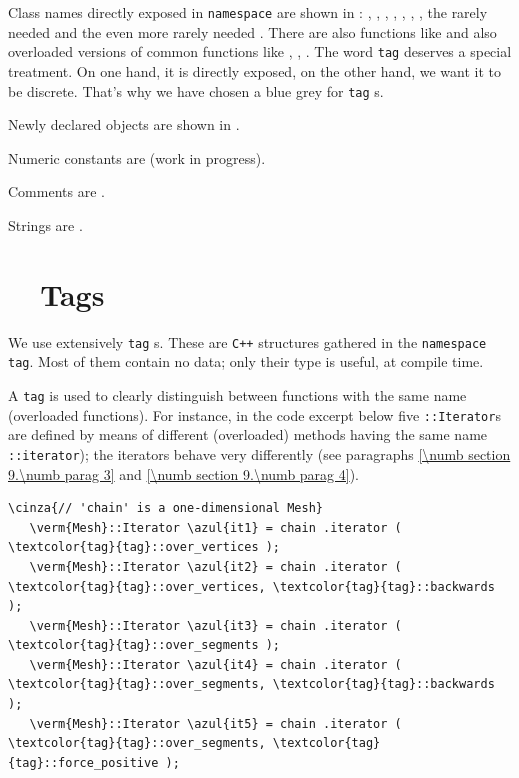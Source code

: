 Class names directly exposed in {\small\tt namespace} {\small\tt{}} are shown in
 : {\small\tt{}}, {\small\tt{}},
{\small\tt{}}, {\small\tt{}},
{\small\tt{}}, {\small\tt{}},
{\small\tt{}}, the rarely needed {\small\tt{}} and
the even more rarely needed {\small\tt{}}.
There are also functions like {\small\tt{}} and also overloaded versions
of common functions like {\small\tt{}}, {\small\tt{}}, {\small\tt{}}.
The word {\small\tt \textcolor{tag}{tag}} deserves a special treatment.
On one hand, it is directly exposed, on the other hand, we want it to be discrete.
That's why we have chosen a \textcolor{tag}{blue grey} for {\small\tt \textcolor{tag}{tag}}\hskip0.8pt s.

Newly declared objects are shown in .

Numeric constants are  (work in progress).

Comments are .

Strings are .


\section{~~Tags}\label{\numb section 11.\numb parag 3}

We use extensively {\small\tt\textcolor{tag}{tag}}\hskip0.8pt s.
These are {\tt C++} structures gathered in the {\small\tt namespace}
{\small\tt \textcolor{tag}{tag}}.
Most of them contain no data; only their type is useful, at compile time.

A {\small\tt\textcolor{tag}{tag}} is used to clearly distinguish between functions with
the same name (overloaded functions).
For instance, in the code excerpt below five {\small\tt{}::Iterator}s are defined
by means of different (overloaded) methods having the same name
{\small\tt{}::iterator});
the iterators behave very differently (see paragraphs \ref{\numb section 9.\numb parag 3} and
\ref{\numb section 9.\numb parag 4}).

\begin{Verbatim}[commandchars=\\\{\},formatcom=\small\tt,baselinestretch=0.94]
   \cinza{// 'chain' is a one-dimensional Mesh}
   \verm{Mesh}::Iterator \azul{it1} = chain .iterator ( \textcolor{tag}{tag}::over_vertices );
   \verm{Mesh}::Iterator \azul{it2} = chain .iterator ( \textcolor{tag}{tag}::over_vertices, \textcolor{tag}{tag}::backwards );
   \verm{Mesh}::Iterator \azul{it3} = chain .iterator ( \textcolor{tag}{tag}::over_segments );
   \verm{Mesh}::Iterator \azul{it4} = chain .iterator ( \textcolor{tag}{tag}::over_segments, \textcolor{tag}{tag}::backwards );
   \verm{Mesh}::Iterator \azul{it5} = chain .iterator ( \textcolor{tag}{tag}::over_segments, \textcolor{tag}{tag}::force_positive );
\end{Verbatim}

